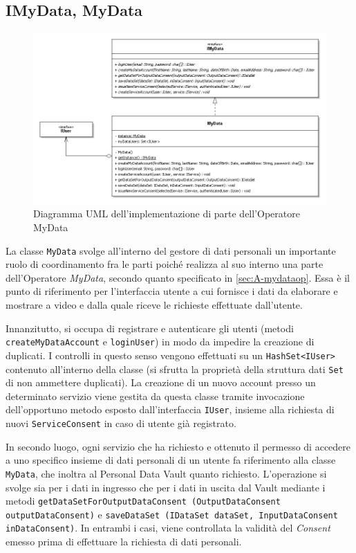 \subsection{IMyData, MyData}
\label{subsec:P-imydataMyData}
\begin{figure} [h]
	\centering
	\includegraphics[width=0.8\linewidth]{pictures/MyData.png}
	\caption{Diagramma UML dell'implementazione di parte dell'Operatore MyData}
	\label{fig:Accounting-MyData}
\end{figure}
La classe \texttt{MyData} svolge all’interno del gestore di dati personali un importante ruolo di coordinamento fra le parti poich\'e realizza al suo interno una parte dell’Operatore \textit{MyData}, secondo quanto specificato in \ref{sec:A-mydataop}. Essa \`e il punto di riferimento per l’interfaccia utente a cui fornisce i dati da elaborare e mostrare a video e dalla quale riceve le richieste effettuate dall’utente.

Innanzitutto, si occupa di registrare e autenticare gli utenti (metodi \texttt{createMyDataAccount} e \texttt{loginUser}) in modo da impedire la creazione di duplicati. I controlli in questo senso vengono effettuati su un \texttt{HashSet<IUser>} contenuto all’interno della classe (si sfrutta la propriet\`a della struttura dati \texttt{Set} di non ammettere duplicati). La creazione di un nuovo account presso un determinato servizio viene gestita da questa classe tramite invocazione dell’opportuno metodo esposto dall’interfaccia \texttt{IUser}, insieme alla richiesta di nuovi \texttt{ServiceConsent} in caso di utente gi\`a registrato.

In secondo luogo, ogni servizio che ha richiesto e ottenuto il permesso di accedere a uno specifico insieme di dati personali di un utente fa riferimento alla classe \texttt{MyData}, che inoltra al Personal Data Vault quanto richiesto. L’operazione si svolge sia per i dati in ingresso che per i dati in uscita dal Vault mediante i metodi \texttt{getDataSetForOutputDataConsent (OutputDataConsent outputDataConsent)} e \texttt{saveDataSet (IDataSet dataSet, InputDataConsent inDataConsent)}. In entrambi i casi, viene controllata la validit\`a del \textit{Consent} emesso prima di effettuare la richiesta di dati personali.

